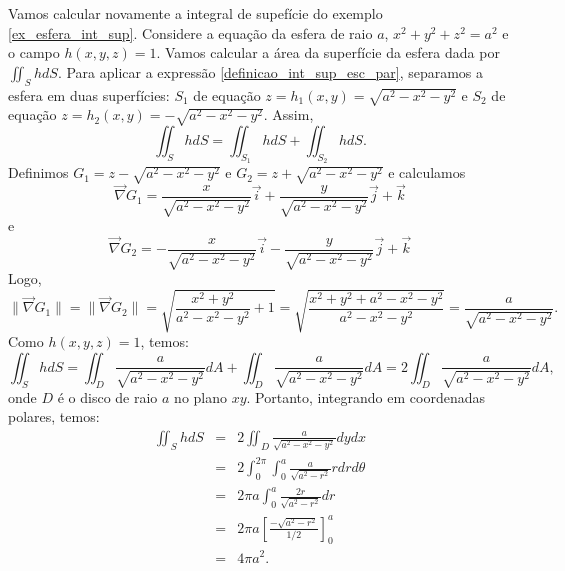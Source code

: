 \begin{ex}Vamos calcular novamente a integral de supefície do exemplo \ref{ex_esfera_int_sup}. Considere a equação da esfera de raio $a$, $x^2+y^2+z^2=a^2$ e o campo $h(x,y,z)=1$. Vamos calcular a área da superfície da esfera dada por $\iint_S h d S $. Para aplicar a expressão \eqref{definicao_int_sup_esc_par}, separamos a esfera em duas superfícies: $S_1$ de equação $z=h_1(x,y)=\sqrt{a^2-x^2-y^2}$ e $S_2$ de equação $z=h_2(x,y)=-\sqrt{a^2-x^2-y^2}$. Assim,
\begin{equation*}
\iint_S h d S=  \iint_{S_1} h d S+\iint_{S_2} h d S.
\end{equation*}
Definimos $G_1=z-\sqrt{a^2-x^2-y^2}$ e $G_2=z+\sqrt{a^2-x^2-y^2}$ e calculamos
$$
\vec{\nabla}G_1=\frac{x}{\sqrt{a^2-x^2-y^2}}\vec{i}+\frac{y}{\sqrt{a^2-x^2-y^2}}\vec{j}+\vec{k}
$$
e 
$$
\vec{\nabla}G_2=-\frac{x}{\sqrt{a^2-x^2-y^2}}\vec{i}-\frac{y}{\sqrt{a^2-x^2-y^2}}\vec{j}+\vec{k}
$$
Logo,
$$
\|\vec{\nabla}G_1\|=\|\vec{\nabla}G_2\|=\sqrt{\frac{x^2+y^2}{a^2-x^2-y^2}+1}=\sqrt{\frac{x^2+y^2+a^2-x^2-y^2}{a^2-x^2-y^2}}=\frac{a}{\sqrt{a^2-x^2-y^2}}.
$$
Como $h(x,y,z)=1$, temos:
\begin{equation*}
\iint_S h d S=  \iint_{D} \frac{a}{\sqrt{a^2-x^2-y^2}}d A+\iint_{D}\frac{a}{\sqrt{a^2-x^2-y^2}}dA=2\iint_{D} \frac{a}{\sqrt{a^2-x^2-y^2}}dA,
\end{equation*}
onde $D$ é o disco de raio $a$ no plano $xy$. Portanto, integrando em coordenadas polares, temos:
\begin{eqnarray*}
\iint_S h d S&=& 2 \iint_{D} \frac{a}{\sqrt{a^2-x^2-y^2}} dydx\\
&=& 2 \int_0^{2\pi}\int_{0}^a \frac{a}{\sqrt{a^2-r^2}} rdrd\theta\\
&=& 2\pi a \int_{0}^a \frac{2r}{\sqrt{a^2-r^2}} dr\\
&=& 2\pi a \left[\frac{-\sqrt{a^2-r^2}}{1/2}\right]_{0}^a\\
&=& 4\pi a^2.
\end{eqnarray*}

\end{ex}

